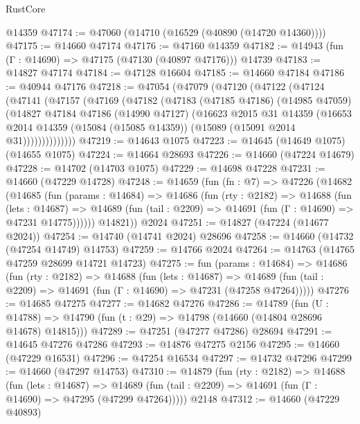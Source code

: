 \begin{lexlean}{RustCore}
\begin{coremodule}
    @14359
@47174 := @47060 (@14710 (@16529 (@40890 (@14720 @14360))))
@47175 := @14660 @47174
@47176 := @47160 @14359
@47182 := @14943 (fun (Γ : @14690) => @47175 (@47130 (@40897 @47176))) @14739
@47183 := @14827 @47174
@47184 := @47128 @16604
@47185 := @14660 @47184
@47186 := @40944 @47176
@47218 := @47054
    (@47079
      (@47120
        (@47122
          (@47124
            (@47141
              (@47157
                (@47169
                  (@47182
                    (@47183
                      (@47185 @47186)
                      (@14985 @47059)
                      (@14827
                        @47184
                        @47186
                        (@14990 @47127)
                        (@16623
                          @2015
                          @31
                          @14359
                          (@16653
                            @2014
                            @14359
                            (@15084 (@15085 @14359))
                            (@15089 (@15091 @2014 @31))))))))))))))
@47219 := @14643 @1075
@47223 := @14645 (@14649 @1075) (@14655 @1075)
@47224 := @14664 @28693
@47226 := @14660 (@47224 @14679)
@47228 := @14702 (@14703 @1075)
@47229 := @14698 @47228
@47231 := @14660 (@47229 @14728)
@47248 := @14659
    (fun (fn : @7) =>
    @47226
      (@14682
        (@14685
          (fun (params : @14684) =>
          @14686
            (fun (rty : @2182) =>
            @14688
              (fun (lets : @14687) =>
              @14689 (fun (tail : @2209) => @14691 (fun (Γ : @14690) => @47231 @14775))))))
        @14821))
    @2024
@47251 := @14827 (@47224 (@14677 @2024))
@47254 := @14740 (@14741 @2024) @28696
@47258 := @14660 (@14732 (@47254 @14749) @14753)
@47259 := @14766 @2024
@47264 := @14763 (@14765 @47259 @28699 @14721 @14723)
@47275 := fun (params : @14684) =>
  @14686
    (fun (rty : @2182) =>
    @14688
      (fun (lets : @14687) =>
      @14689 (fun (tail : @2209) => @14691 (fun (Γ : @14690) => @47231 (@47258 @47264)))))
@47276 := @14685 @47275
@47277 := @14682 @47276
@47286 := @14789
    (fun (U : @14788) => @14790 (fun (t : @29) => @14798 (@14660 (@14804 @28696 @14678) @14815)))
@47289 := @47251 (@47277 @47286) @28694
@47291 := @14645 @47276 @47286
@47293 := @14876 @47275 @2156
@47295 := @14660 (@47229 @16531)
@47296 := @47254 @16534
@47297 := @14732 @47296
@47299 := @14660 (@47297 @14753)
@47310 := @14879
    (fun (rty : @2182) =>
    @14688
      (fun (lets : @14687) =>
      @14689 (fun (tail : @2209) => @14691 (fun (Γ : @14690) => @47295 (@47299 @47264)))))
    @2148
@47312 := @14660 (@47229 @40893)

\end{coremodule}
\end{lexlean}
